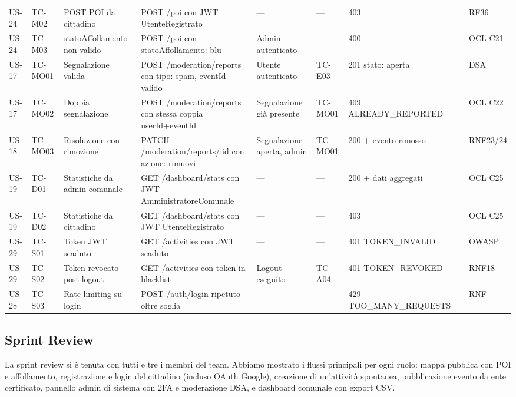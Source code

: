 \documentclass[11pt,a4paper]{article}
\begin{document}
\begin{longtable}{p{0.9cm} p{1.1cm} p{2.6cm} p{3.0cm} p{1.8cm} p{1.0cm} p{2.4cm} p{0.9cm} p{1.3cm}}
  US-24 & TC-M02 & POST POI da cittadino & POST /poi con JWT UtenteRegistrato & --- & --- & 403 & & RF36 \\
  \rowcolor{rowAlt}
  US-24 & TC-M03 & statoAffollamento non valido & POST /poi con statoAffollamento: blu & Admin autenticato & --- & 400 & & OCL C21 \\
  \midrule
  US-17 & TC-MO01 & Segnalazione valida & POST /moderation/reports con tipo: spam, eventId valido & Utente autenticato & TC-E03 & 201 stato: aperta & & DSA \\
  \rowcolor{rowAlt}
  US-17 & TC-MO02 & Doppia segnalazione & POST /moderation/reports con stessa coppia userId+eventId & Segnalazione gi\`{a} presente & TC-MO01 & 409 ALREADY\_REPORTED & & OCL C22 \\
  US-18 & TC-MO03 & Risoluzione con rimozione & PATCH /moderation/reports/:id con azione: rimuovi & Segnalazione aperta, admin & TC-MO01 & 200 + evento rimosso & & RNF23/24 \\
  \midrule
  \rowcolor{rowAlt}
  US-19 & TC-D01 & Statistiche da admin comunale & GET /dashboard/stats con JWT AmministratoreComunale & --- & --- & 200 + dati aggregati & & OCL C25 \\
  US-19 & TC-D02 & Statistiche da cittadino & GET /dashboard/stats con JWT UtenteRegistrato & --- & --- & 403 & & OCL C25 \\
  \midrule
  \rowcolor{rowAlt}
  US-29 & TC-S01 & Token JWT scaduto & GET /activities con JWT scaduto & --- & --- & 401 TOKEN\_INVALID & & OWASP \\
  US-29 & TC-S02 & Token revocato post-logout & GET /activities con token in blacklist & Logout eseguito & TC-A04 & 401 TOKEN\_REVOKED & & RNF18 \\
  \rowcolor{rowAlt}
  US-28 & TC-S03 & Rate limiting su login & POST /auth/login ripetuto oltre soglia & --- & --- & 429 TOO\_MANY\_REQUESTS & & RNF \\
  \bottomrule
  \end{longtable}
  \endgroup

  \subsection{Sprint Review}
  La sprint review si \`{e} tenuta con tutti e tre i membri del team. Abbiamo mostrato i
  flussi principali per ogni ruolo: mappa pubblica con POI e affollamento, registrazione e
  login del cittadino (incluso OAuth Google), creazione di un'attivit\`{a} spontanea,
  pubblicazione evento da ente certificato, pannello admin di sistema con 2FA e moderazione
  DSA, e dashboard comunale con export CSV.
\end{document}
